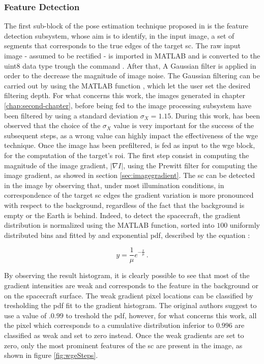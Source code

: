 \subsubsection{Feature Detection}
The first sub-block of the pose estimation technique proposed in \cite{Sharma2018} is the feature detection subsystem, whose aim is to  identify, in the input image, a set of segments that corresponds to the true edges of the target \acrshort{sc}.
The raw input image - assumed to be rectified - is imported in MATLAB and is converted to the uint8 data type trough the command  . After that, A Gaussian filter is applied in order to the decrease the magnitude of image noise. The Gaussian filtering can be carried out by using the MATLAB function , which let the user set the desired filtering depth. For what concerns this work, the images generated in chapter \ref{chap:second-chapter}, before being fed to the image processing subsystem have been filtered by using a standard deviation $\sigma_X = 1.15$. During this work, has been observed that the choice of the $\sigma_X$ value is very important for the success of the subsequent steps, as a wrong value can highly impact the effectiveness of the \acrshort{wge} technique. Once the image has been prefiltered, is fed as input to the \acrshort{wge} block, for the computation of the target's \acrshort{roi}. The first step consist in computing the magnitude of the image gradient, $|\nabla I|$,  using the Prewitt filter for computing the image gradient, as showed in section \ref{sec:imagegradient}.
The \acrshort{sc} can be detected in the image by observing that, under most illumination conditions, in correspondence of the target \acrshort{sc} edges the gradient variation is more pronounced with respect to the background, regardless of the fact that the background is empty or the Earth is behind.
Indeed, to detect the spacecraft, the gradient distribution is normalized using the MATLAB  function, sorted into $100$ uniformly distributed bins and fitted by and exponential \acrfull{pdf}, described by the equation :

\begin{equation*}
  y = \frac{1}{\mu} e^{-\frac{x}{\mu}} \,.
\end{equation*}

By observing the result histogram, it is clearly possible to see that most of the gradient intensities are weak and corresponds to the feature in the background or on the spacecraft surface. The weak gradient pixel locations can be classified by tresholding the \acrshort{pdf} fit to the gradient histogram. The original authors suggest to use a value of $.0.99$ to treshold the \acrshort{pdf}, however, for what concerns this work, all the pixel which corresponds to a cumulative distribution inferior to $0.996$ are classified as weak and set to zero instead. Once the weak gradients are set to zero, only the most prominent features of the \acrshort{sc} are present in the image, as shown in figure \ref{fig:wgeSteps}.

